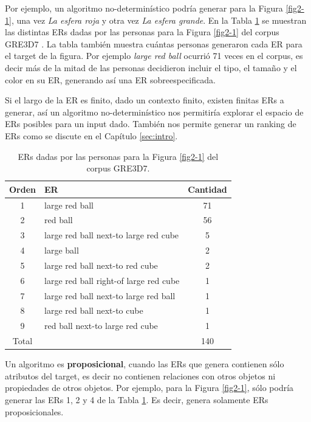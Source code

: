 Por ejemplo, un algoritmo no-determin\'istico podr\'ia generar para la Figura \ref{fig2-1}, una vez {\it La esfera roja} y otra vez {\it La esfera grande}. En la Tabla \ref{er-gre3d7-stimulus} se muestran las distintas ERs dadas por las personas para la Figura \ref{fig2-1} del corpus GRE3D7 \cite{gre3d7}. La tabla tambi\'en muestra cu\'antas personas generaron cada ER para el target de la figura. Por ejemplo {\it large red ball} ocurri\'o 71 veces en el corpus, es decir m\'as de la mitad de las personas decidieron incluir el tipo, el tama\~no y el color en su ER, generando as\'i una ER sobreespecificada.

Si el largo de la ER es finito, dado un contexto finito, existen finitas ERs a generar, as\'i un algoritmo no-determin\'istico nos permitir\'ia explorar el espacio de ERs posibles para un input dado. Tambi\'en nos permite generar un ranking de ERs como se discute en el Cap\'itulo \ref{sec:intro}.
\medskip
\begin{table}[h!]
\begin{center}
\begin{tabular}{|c|l|c|}
\hline
 Orden&ER& Cantidad \\
\hline
1&large red ball & 71 \\
2&red ball & 56 \\ 
3&large red ball next-to large red cube & 5 \\ 
4&large ball & 2 \\ 
5&large red ball next-to red cube & 2 \\ 
6&large red ball right-of large red cube & 1 \\ 
7&large red ball next-to large red ball & 1 \\ 
8&large red ball next-to cube & 1 \\ 
9&red ball next-to large red cube & 1 \\ \hline
Total & &140 \\ \hline
\end{tabular}
\caption{ERs dadas por las personas para la Figura \ref{fig2-1} del corpus GRE3D7.} 
\label{er-gre3d7-stimulus}
\vspace*{-.5cm}
\end{center}
\end{table}

Un algoritmo es {\bf proposicional}, cuando las ERs que genera contienen s\'olo atributos del target, es decir no contienen relaciones con otros objetos ni propiedades de otros objetos. Por ejemplo, para la Figura \ref{fig2-1}, s\'olo podr\'ia generar las ERs 1, 2 y 4 de la Tabla \ref{er-gre3d7-stimulus}. Es decir, genera solamente ERs proposicionales.


